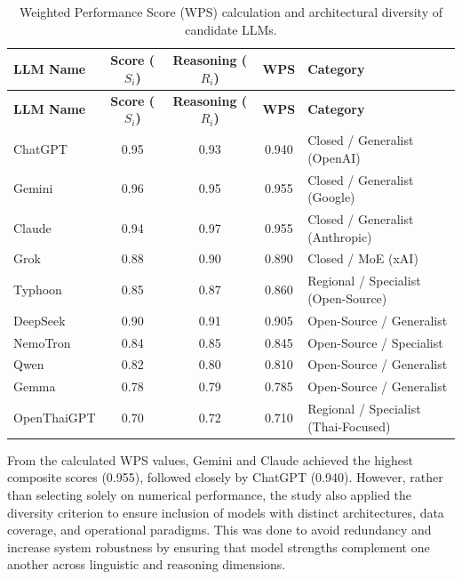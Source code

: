 {
\setlength{\LTleft}{-0.4cm}
\setlength{\LTright}{0pt}
\centering
\begin{longtable}{l c c c l}
    \caption{Weighted Performance Score (WPS) calculation and architectural diversity of candidate LLMs.}
    \label{tab:wps_result}
    \\

    \hline
    \textbf{LLM Name} & \textbf{Score ($S_i$)} & \textbf{Reasoning ($R_i$)} & \textbf{WPS} & \textbf{Category} \\
    \hline
    \endfirsthead

    \hline
    \textbf{LLM Name} & \textbf{Score ($S_i$)} & \textbf{Reasoning ($R_i$)} & \textbf{WPS} & \textbf{Category} \\
    \hline
    \endhead

    \hline
    \endfoot

    ChatGPT & 0.95 & 0.93 & 0.940 & Closed / Generalist (OpenAI) \\
    Gemini & 0.96 & 0.95 & 0.955 & Closed / Generalist (Google) \\
    Claude & 0.94 & 0.97 & 0.955 & Closed / Generalist (Anthropic) \\
    Grok & 0.88 & 0.90 & 0.890 & Closed / MoE (xAI) \\
    Typhoon & 0.85 & 0.87 & 0.860 & Regional / Specialist (Open-Source) \\
    DeepSeek & 0.90 & 0.91 & 0.905 & Open-Source / Generalist \\
    NemoTron & 0.84 & 0.85 & 0.845 & Open-Source / Specialist \\
    Qwen & 0.82 & 0.80 & 0.810 & Open-Source / Generalist \\
    Gemma & 0.78 & 0.79 & 0.785 & Open-Source / Generalist \\
    OpenThaiGPT & 0.70 & 0.72 & 0.710 & Regional / Specialist (Thai-Focused) \\

\end{longtable}
}

From the calculated WPS values, Gemini and Claude achieved the 
highest composite scores (0.955), followed closely by ChatGPT 
(0.940). 
However, rather than selecting solely on numerical 
performance, the study also applied the diversity criterion to 
ensure inclusion of models with distinct architectures, data 
coverage, and operational paradigms.
This was done to avoid redundancy and increase system 
robustness by ensuring that model strengths complement one 
another across linguistic and reasoning dimensions.

